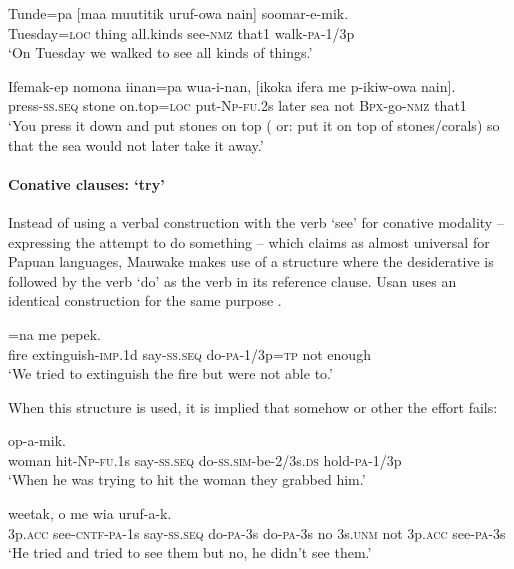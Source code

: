 \ea%
\label{ex:x1633}
\gll Tunde=pa  [maa  muutitik  uruf-owa  nain]  soomar-e-mik.\\
Tuesday=\textsc{loc} thing all.kinds see-\textsc{nmz} that1  walk-\textsc{pa}-1/3p\\
\glt`On Tuesday we walked to see all kinds of things.'
\z


\ea%
\label{ex:x1634}
\gll Ifemak-ep  nomona  iinan=pa  wua-i-nan,  [ikoka  ifera  me p-ikiw-owa  nain]. \\
press-\textsc{ss}.\textsc{seq} stone on.top=\textsc{loc} put-\textsc{Np}-\textsc{fu}.2s later sea not \textsc{Bpx}-go-\textsc{nmz} that1\\
\glt`You press it down and put stones on top ( or: put it on top of stones/corals) so that the sea would not later take it away.'
\z


\paragraph[Conative clauses: `try' ]{Conative clauses: `try'} 

Instead of using a verbal construction with the verb `see' for conative modality -- expressing the attempt to do something -- which \citet[152]{Foley1986} claims as almost universal for Papuan languages, Mauwake makes use of a structure where the desiderative is followed by the verb  `do' as the verb in its reference clause. Usan uses an identical construction for the same purpose \citep[258]{Reesink1987}. 

\ea%
\label{ex:x373}
=na  me  pepek.\\
fire  extinguish-\textsc{imp}.1d say-\textsc{ss}.\textsc{seq} do-\textsc{pa}-1/3p=\textsc{tp} not enough\\
\glt`We tried to extinguish the fire but were not able to.'
\z


When this structure is used, it is implied that somehow or other the effort fails:

\ea%
\label{ex:x374}
  op-a-mik.\\
woman hit-\textsc{Np}-\textsc{fu}.1s say-\textsc{ss}.\textsc{seq} do-\textsc{ss}.\textsc{sim}-be-2/3s.\textsc{ds} hold-\textsc{pa}-1/3p\\
\glt`When he was trying to hit the woman they grabbed him.'
\z


\ea%
\label{ex:x1606}
 weetak, o me wia  uruf-a-k.\\
3p.\textsc{acc} see-\textsc{cntf}-\textsc{pa}-1s say-\textsc{ss}.\textsc{seq} do-\textsc{pa}-3s do-\textsc{pa}-3s no 3s.\textsc{unm} not  3p.\textsc{acc} see-\textsc{pa}-3s\\
\glt`He tried and tried to see them but no, he didn't see them.'
\z


